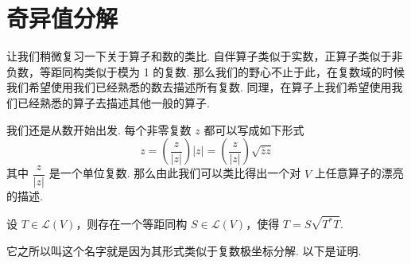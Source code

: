 \chapter{奇异值分解}

让我们稍微复习一下关于算子和数的类比. 自伴算子类似于实数，正算子类似于非负数，等距同构类似于模为 1 的复数. 那么我们的野心不止于此，在复数域的时候我们希望使用我们已经熟悉的数去描述所有复数. 同理，在算子上我们希望使用我们已经熟悉的算子去描述其他一般的算子.


我们还是从数开始出发. 每个非零复数 $ z $ 都可以写成如下形式
\[ z = \left(\frac{z}{\lvert z \rvert}\right)\lvert z \rvert = \left(\frac{z}{\lvert z \rvert}\right)\sqrt{\overline{z}z} \]
其中 $ \dfrac{z}{\lvert z \rvert} $ 是一个单位复数. 那么由此我们可以类比得出一个对 $ V $ 上任意算子的漂亮的描述.

\begin{theorem}[极分解定理] 
    设 $ T \in \mathcal{L}(V) $，则存在一个等距同构 $ S \in \mathcal{L}(V) $，使得 $ T = S\sqrt{T^*T} $.
\end{theorem}

它之所以叫这个名字就是因为其形式类似于复数极坐标分解. 以下是证明.

